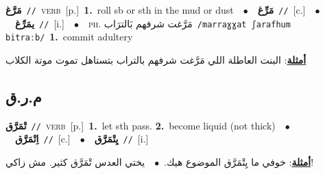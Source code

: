 \documentclass[10pt,a4paper,twoside]{article} %
\begin{document}
\begin{multicols}{2}
{\setlength\topsep{0pt}\textbf{\foreignlanguage{arabic}{مَرَّغ}}\ {\color{gray}\texttt{//}\color{black}}\ \textsc{verb}\ [p.]\ \textbf{1.}~roll sb or sth in the mud or dust\ \ $\bullet$\ \ \setlength\topsep{0pt}\textbf{\foreignlanguage{arabic}{مَرِّغ}}\ {\color{gray}\texttt{//}\color{black}}\ [c.]\ \ $\bullet$\ \ \setlength\topsep{0pt}\textbf{\foreignlanguage{arabic}{يمَرِّغ}}\ {\color{gray}\texttt{//}\color{black}}\ [i.]\ \ $\bullet$\ \ \textsc{ph.} \color{gray} \foreignlanguage{arabic}{مَرَّغت شرفهم بَالترَاب}\color{black}\ {\color{gray}\texttt{/{\sffamily marraɣɣat ʃarafhum bitraːb}/}\color{black}}\ \textbf{1.}~commit adultery\  \begin{flushright}\color{gray}\foreignlanguage{arabic}{\textbf{\underline{\foreignlanguage{arabic}{أمثلة}}}: البنت العاطلة اللي مَرَّغت شرفهم بالتراب بتستاهل تموت موتة الكلاب}\end{flushright}\color{black}} \vspace{2mm}

\vspace{-3mm}
\subsection*{\color{blue}\foreignlanguage{arabic}{م.ر.ق}\color{blue}{}} 

{\setlength\topsep{0pt}\textbf{\foreignlanguage{arabic}{تْمَرَّق}}\ {\color{gray}\texttt{//}\color{black}}\ \textsc{verb}\ [p.]\ \textbf{1.}~let sth pass.  \textbf{2.}~become liquid (not thick)\ \ $\bullet$\ \ \setlength\topsep{0pt}\textbf{\foreignlanguage{arabic}{اِتْمَرَّق}}\ {\color{gray}\texttt{//}\color{black}}\ [c.]\ \ $\bullet$\ \ \setlength\topsep{0pt}\textbf{\foreignlanguage{arabic}{يِتْمَرَّق}}\ {\color{gray}\texttt{//}\color{black}}\ [i.]\  \begin{flushright}\color{gray}\foreignlanguage{arabic}{\textbf{\underline{\foreignlanguage{arabic}{أمثلة}}}: خوفي ما يِتْمَرَّق الموضوع هيك.\ $\bullet$\ \  يختي العدس تْمَرَّق كثير. مش زاكي!}\end{flushright}\color{black}} \vspace{2mm}


\end{multicols}
\end{document}
